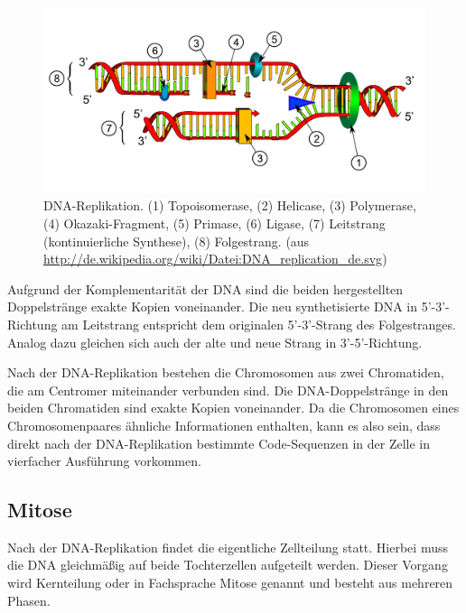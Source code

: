 \begin{figure}[htbp]
\begin{center}
\includegraphics[width=\textwidth]{bilder/DNA_Replikation}
\end{center}
\caption[DNA-Replikation. (aus \protect\url{http://de.wikipedia.org/wiki/Datei:DNA_replication_de.svg})] {DNA-Replikation. (1) Topoisomerase, (2) Helicase, (3) Polymerase, (4) Okazaki-Fragment, (5) Primase, (6) Ligase, (7) Leitstrang (kontinuierliche Synthese), (8) Folgestrang. (aus \protect\url{http://de.wikipedia.org/wiki/Datei:DNA_replication_de.svg})}
\label{fig:bio:zell:repli}
\end{figure}

Aufgrund der Komplementarität der DNA sind die beiden hergestellten Doppelstränge exakte Kopien voneinander. Die neu synthetisierte DNA in 5'-3'-Richtung am Leitstrang entspricht dem originalen 5'-3'-Strang des Folgestranges. Analog dazu gleichen sich auch der alte und neue Strang in 3'-5'-Richtung.

Nach der DNA-Replikation bestehen die Chromosomen aus zwei Chromatiden, die am Centromer miteinander verbunden sind. Die DNA-Doppelstränge in den beiden Chromatiden sind exakte Kopien voneinander. Da die Chromosomen eines Chromosomenpaares ähnliche Informationen enthalten, kann es also sein, dass direkt nach der DNA-Replikation bestimmte Code-Sequenzen in der Zelle in vierfacher Ausführung vorkommen.

\subsection{Mitose}
\label{sec:bio:zell:mitose}

Nach der DNA-Replikation findet die eigentliche Zellteilung statt. Hierbei muss die DNA gleichmäßig auf beide Tochterzellen aufgeteilt werden. Dieser Vorgang wird Kernteilung oder in Fachsprache Mitose genannt und besteht aus mehreren Phasen.

